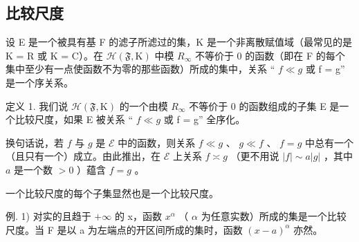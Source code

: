 \subsection{比较尺度}

设 E 是一个被具有基 F 的滤子所滤过的集，K 是一个非离散赋值域（最常见的是 K = R 或 K = C）。在 \(\mathcal{H}(\mathfrak{F}, \mathrm{K})\) 中模 \(R_{\infty}\) 不等价于 0 的函数（即在 F 的每个集中至少有一点使函数不为零的那些函数）所成的集中，关系 “ \(f \ll g\) 或 f = g” 是一个序关系。

定义 1. 我们说 \(\mathcal{H}(\mathfrak{F},\mathrm{K})\) 的一个由模 \(R_{\infty}\) 不等价于 0 的函数组成的子集 E 是一个比较尺度，如果 E 被关系 “ \(f \ll g\) 或 f = g” 全序化。

换句话说，若 \(f\) 与 \(g\) 是 \(\mathcal{E}\) 中的函数，则关系 \(f \ll g\) 、 \(g \ll f\) 、 \(f = g\) 中总有一个（且只有一个）成立。由此推出，在 \(\mathcal{E}\) 上关系 \(f \asymp g\) （更不用说 \(|f| \sim a |g|\) ，其中 \(a\) 是一个数 \(> 0\) ）蕴含 \(f = g\) 。

一个比较尺度的每个子集显然也是一个比较尺度。

例. 1) 对实的且趋于 \(+\infty\) 的 x，函数 \(x^{\alpha}\) （ \(\alpha\) 为任意实数）所成的集是一个比较尺度。当 F 是以 a 为左端点的开区间所成的集时，函数 \((x - a)^{\alpha}\) 亦然。

